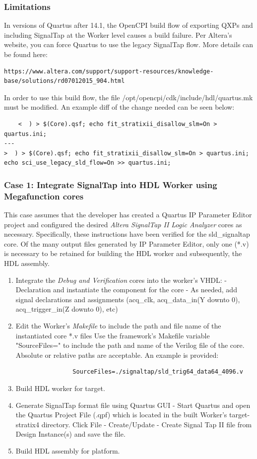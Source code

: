 \begin{flushleft}
	\subsubsection{Limitations}
	In versions of Quartus after 14.1, the OpenCPI build flow of exporting QXPs and including SignalTap at the Worker level causes a build failure. Per Altera's website, you can force Quartus to use the legacy SignalTap flow. More details can be found here: \begin{verbatim}https://www.altera.com/support/support-resources/knowledge-base/solutions/rd07012015_904.html\end{verbatim}
	In order to use this build flow, the file /opt/opencpi/cdk/include/hdl/quartus.mk must be modified. An example diff of the change needed can be seen below:
	\scriptsize\begin{verbatim}
	<  ) > $(Core).qsf; echo fit_stratixii_disallow_slm=On > quartus.ini;
---
>  ) > $(Core).qsf; echo fit_stratixii_disallow_slm=On > quartus.ini; echo sci_use_legacy_sld_flow=On >> quartus.ini;
	\end{verbatim}\normalsize
	\subsubsection{Case 1: Integrate SignalTap into HDL Worker using Megafunction cores}
	This case assumes that the developer has created a Quartus IP Parameter Editor project and configured the desired \textit{Altera SignalTap II Logic Analyzer} cores as necessary. Specifically, these instructions have been verified for the sld\_signaltap core. Of the many output files generated by IP Parameter Editor, only one (*.v) is necessary to be retained for building the HDL worker and subsequently, the HDL assembly.
		\begin{enumerate}
			\item Integrate the \textit{Debug and Verification} cores into the worker's VHDL:
				\subitem - Declaration and instantiate the component for the core
				\subitem - As needed, add signal declarations and assignments (acq\_clk, acq\_data\_in(Y downto 0), acq\_trigger\_in(Z downto 0), etc)
			\item Edit the Worker's \textit{Makefile} to include the path and file name of the instantiated core *.v files Use the framework's Makefile variable "SourceFiles=" to include the path and	name of the Verilog file of the core. Absolute or relative paths are acceptable. An example is provided:
			\small\begin{verbatim}
				SourceFiles=./signaltap/sld_trig64_data64_4096.v
			\end{verbatim}
		 	\item Build HDL worker for target.
		 	\item Generate SignalTap format file using Quartus GUI
		 		\subitem - Start Quartus and open the Quartus Project File (.qpf) which is located in the built Worker's target-stratix4 directory. Click File - Create/Update - Create Signal Tap II file from Design Instance(s) and save the file.
			\item Build HDL assembly for platform.
		\end{enumerate}


\end{flushleft}
